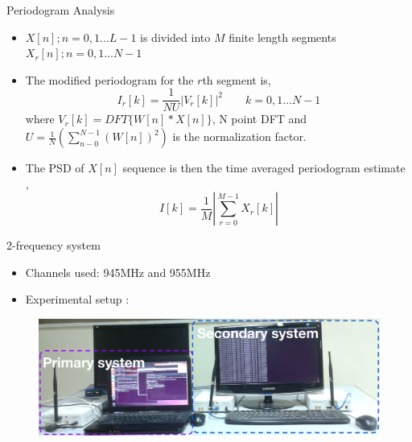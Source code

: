 \documentclass{beamer}
\begin{document}
  \begin{frame}{Periodogram Analysis}
    \begin{itemize}
        \item $X[n]; n = 0,1...L-1$ is  divided into $M$ finite length 
        segments $X_{r}[n]; n = 0,1...N-1 $
        \item The modified periodogram for the $r$th segment is,
          \begin{equation*}
              I_{r}[k] = \frac{1}{NU} \left| V_{r}[k]\right|^2     \qquad k = 0,1...N-1 
          \end{equation*}
          where $V_{r}[k] = DFT\{W[n]*X[n]\}$, N point DFT
          and $U = \frac{1}{N}(\sum_{n-0}^{N-1} (W[n])^2)$ is the normalization factor. 
        \item The PSD of $X[n]$ sequence 
          is then the time averaged periodogram estimate ,
          \begin{equation*}
              I[k] = \frac{1}{M}\left|\sum_{r=0}^{M-1}X_{r}[k]\right|
          \end{equation*}
    \end{itemize}
  \end{frame}

  
  
  
  
  \begin{frame}{2-frequency system}
    \begin{itemize}
      \item Channels used: 945MHz and 955MHz
      \item Experimental setup :
    \end{itemize}
    \begin{figure}
      \centering
      \includegraphics[width=0.97\linewidth]{img/freq2}
    \end{figure}
  \end{frame}
  
\end{document}
